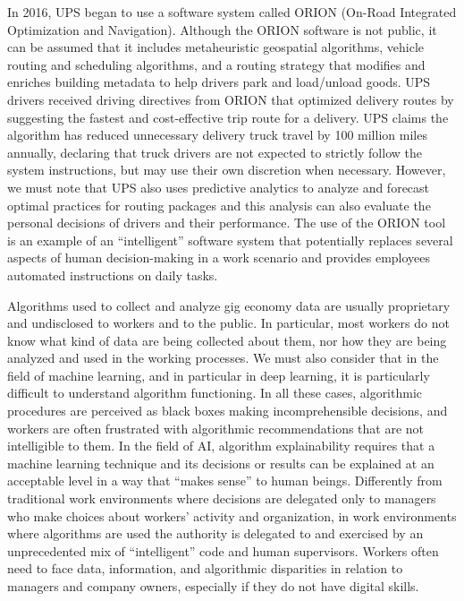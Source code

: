 In 2016, UPS began to use a software system called ORION (On-Road Integrated Optimization and Navigation). Although the ORION software is not public, it can be assumed that it includes metaheuristic geospatial algorithms, vehicle routing and scheduling algorithms, and a routing strategy that modifies and enriches building metadata to help drivers park and load/unload goods. UPS drivers received driving directives from ORION that optimized delivery routes by suggesting the fastest and cost-effective trip route for a delivery. UPS claims the algorithm has reduced unnecessary delivery truck travel by 100 million miles annually, declaring that truck drivers are not expected to strictly follow the system instructions, but may use their own discretion when necessary. However, we must note that UPS also uses predictive analytics to analyze and forecast optimal practices for routing packages and this analysis can also evaluate the personal decisions of drivers and their performance. The use of the ORION tool is an example of an ``intelligent'' software system that potentially replaces several aspects of human decision-making in a work scenario and provides employees automated instructions on daily tasks.

Algorithms used to collect and analyze gig economy data are usually proprietary and undisclosed to workers and to the public. In particular, most workers do not know what kind of data are being collected about them, nor how they are being analyzed and used in the working processes. We must also consider that in the field of machine learning, and in particular in deep learning, it is particularly difficult to understand algorithm functioning. In all these\vadjust{\vspace*{10pt}\pagebreak} cases, algorithmic procedures are perceived as black boxes making incomprehensible decisions, and workers are often frustrated with algorithmic recommendations that are not intelligible to them. In the field of AI, algorithm explainability requires that a machine learning technique and its decisions or results can be explained at an acceptable level in a way that ``makes sense'' to human beings. Differently from traditional work environments where decisions are delegated only to managers who make choices about workers' activity and organization, in work environments where algorithms are used the authority is delegated to and exercised by an unprecedented mix of ``intelligent'' code and human supervisors. Workers often need to face data, information, and algorithmic disparities in relation to managers and company owners, especially if they do not have digital skills.

